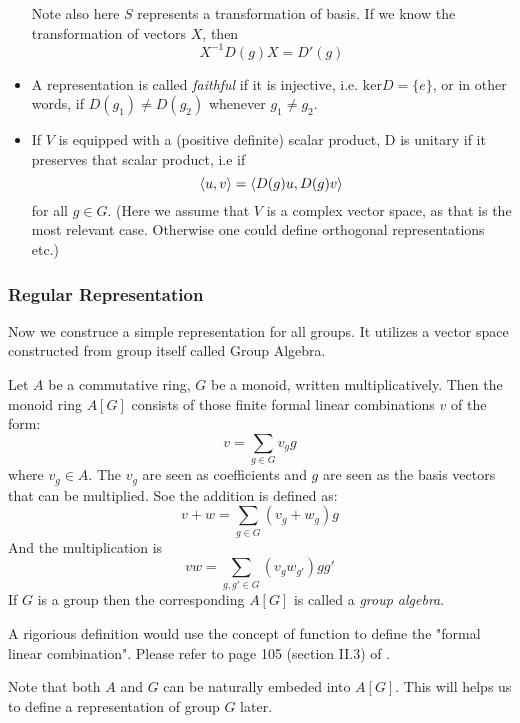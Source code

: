 \begin{itemize}
        Note also here $S$ represents a transformation of basis. If we
        know the transformation of vectors $X$, then
        \begin{equation}
            X^{-1} D(g)X = D'(g)
        \end{equation}
    \item A representation is called
        \textit{faithful} if it is injective, i.e.
        $\mathrm{ker} D = \{e\}$, or in other words, if $D(g_1) \neq
        D(g_2)$ whenever $g_1 \neq g_2$.
    \item If $V$ is equipped with a (positive definite) scalar
        product, D is unitary if it preserves that scalar product, i.e
        if
        \begin{equation}
            \braket{u,v} = \braket{D(g)u,D(g)v}
        \end{equation}
        for all $g\in G$. (Here we assume that $V$ is a complex vector
        space, as that is the most relevant case. Otherwise one could
        define orthogonal representations etc.)
\end{itemize}

\subsubsection{Regular Representation}
\label{sec:Regular-Representation}

Now we construce a simple representation for all groups. It utilizes a
vector space constructed from group itself called Group Algebra.

\begin{defi}

    Let $A$ be a commutative ring, $G$ be a monoid, written
    multiplicatively. Then the monoid ring $A[G]$ consists of those
    finite formal linear combinations $v$ of the form:
    \begin{equation}
        v = \sum_{g\in G} v_g g
    \end{equation}
    where $v_g \in A$. The $v_g$ are seen as coefficients and $g$ are
    seen as the basis vectors that can be multiplied. Soe the addition
    is defined as:
    \begin{equation}
        v+w = \sum_{g\in G} (v_g + w_g) g
    \end{equation}
    And the multiplication is
    \begin{equation}
        v w = \sum_{g,g'\in G} (v_g w_{g'}) gg'
    \end{equation}
    If $G$ is a group then the
    corresponding $A[G]$ is called a \textit{group algebra}.
\end{defi}
A rigorious definition would use the concept of function to define the
"formal linear combination". Please refer to page 105 (section II.3) of
\cite{lang-algebra}. 
\begin{remark}
    Note that both $A$ and $G$ can be naturally embeded into $A[G]$.
    This will helps us to define a representation of group $G$ later.
\end{remark}

